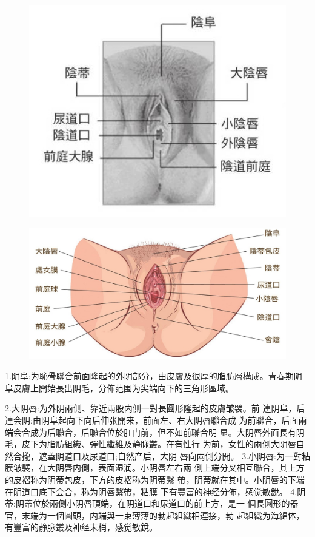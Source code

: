 \documentclass[12pt,UTF8]{ctexbook}
\begin{document}
\begin{figure}[htbp]
	\centering
	\includegraphics[width=0.7\linewidth]{2}
	\caption{}
	\label{fig:1}
\end{figure}

\begin{figure}[htbp]
	\centering
	\includegraphics[width=0.7\linewidth]{7}
	\caption{}
	\label{fig:1}
\end{figure}

1.阴阜:为恥骨聯合前面隆起的外阴部分，由皮膚及很厚的脂肪層構成。青春期阴阜皮膚上開始長出阴毛，分佈范围为尖端向下的三角形區域。

2.大阴唇:为外阴兩側、靠近兩股内側一對長圓形隆起的皮膚皱襞。前
連阴阜，后連会阴;由阴阜起向下向后伸张開来，前面左、右大阴唇聯合成
为前聯合，后面兩端会合成为后聯合，后聯合位於肛门前，但不如前聯合明
显。大阴唇外面長有阴毛，皮下为脂肪組織、彈性纖維及静脉叢。在有性行
为前，女性的兩側大阴唇自然合攏，遮蓋阴道口及尿道口;自然产后，大阴
唇向兩側分開。
3.小阴唇:为一對粘膜皱襞，在大阴唇内側，表面湿润。小阴唇左右兩
側上端分叉相互聯合，其上方的皮褶称为阴蒂包皮，下方的皮褶称为阴蒂繫
帶，阴蒂就在其中。小阴唇的下端在阴道口底下会合，称为阴唇繫帶，粘膜
下有豐富的神经分佈，感觉敏銳。
4.阴蒂:阴蒂位於兩側小阴唇頂端，在阴道口和尿道口的前上方，是一
個長圓形的器官，末端为一個圓頭，内端與一束薄薄的勃起組織相連接，勃
起組織为海綿体，有豐富的静脉叢及神经末梢，感觉敏銳。
\end{document}
